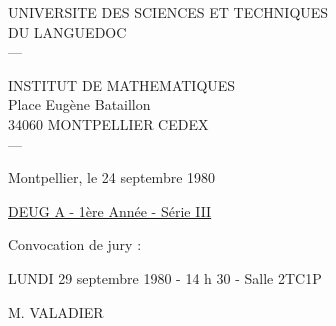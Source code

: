 UNIVERSITE DES SCIENCES ET TECHNIQUES\\
DU LANGUEDOC\\
---

INSTITUT DE MATHEMATIQUES\\
Place Eugène Bataillon\\
34060 MONTPELLIER CEDEX\\
---

Montpellier, le 24 septembre 1980

\uline{DEUG A - 1ère Année - Série III}

Convocation de jury :

LUNDI 29 septembre 1980 - 14 h 30 - Salle 2TC1P

M. VALADIER

